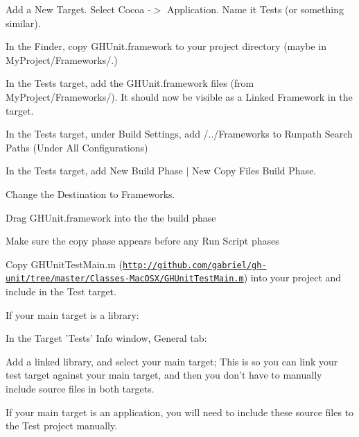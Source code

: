 \begin{DoxyItemize}
\item \-Add a {\ttfamily \-New \-Target}. \-Select {\ttfamily \-Cocoa -\/$>$ \-Application}. \-Name it {\ttfamily \-Tests} (or something similar).
\item \-In the \-Finder, copy {\ttfamily \-G\-H\-Unit.\-framework} to your project directory (maybe in \-My\-Project/\-Frameworks/.)
\item \-In the {\ttfamily \-Tests} target, add the {\ttfamily \-G\-H\-Unit.\-framework} files (from \-My\-Project/\-Frameworks/). \-It should now be visible as a {\ttfamily \-Linked \-Framework} in the target.
\item \-In the {\ttfamily \-Tests} target, under \-Build \-Settings, add {\ttfamily /../\-Frameworks} to {\ttfamily \-Runpath \-Search \-Paths} (\-Under \-All \-Configurations)
\item \-In the {\ttfamily \-Tests} target, add {\ttfamily \-New \-Build \-Phase} $|$ {\ttfamily \-New \-Copy \-Files \-Build \-Phase}.
\begin{DoxyItemize}
\item \-Change the \-Destination to {\ttfamily \-Frameworks}.
\item \-Drag {\ttfamily \-G\-H\-Unit.\-framework} into the the build phase
\item \-Make sure the copy phase appears before any {\ttfamily \-Run \-Script} phases
\end{DoxyItemize}
\item \-Copy \-G\-H\-Unit\-Test\-Main.\-m (\href{http://github.com/gabriel/gh-unit/tree/master/Classes-MacOSX/GHUnitTestMain.m}{\tt http\-://github.\-com/gabriel/gh-\/unit/tree/master/\-Classes-\/\-Mac\-O\-S\-X/\-G\-H\-Unit\-Test\-Main.\-m}) into your project and include in the \-Test target.
\end{DoxyItemize}


\begin{DoxyItemize}
\item \-If your main target is a library\-:
\begin{DoxyItemize}
\item \-In the {\ttfamily \-Target '\-Tests' \-Info} window, {\ttfamily \-General} tab\-:
\begin{DoxyItemize}
\item \-Add a linked library, and select your main target; \-This is so you can link your test target against your main target, and then you don't have to manually include source files in both targets.
\end{DoxyItemize}
\end{DoxyItemize}
\item \-If your main target is an application, you will need to include these source files to the {\ttfamily \-Test} project manually.
\end{DoxyItemize}


